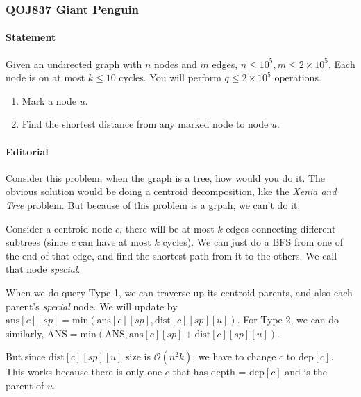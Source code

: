\subsubsection{QOJ837 Giant Penguin}


\paragraph{Statement}
Given an undirected graph with $n$ nodes and $m$ edges, $n \le 10^5, m \le 2\times10^5$. Each node is on at most $k \le 10$ cycles. You will perform $q \le 2\times10^5$ operations.
\begin{enumerate}
    \item Mark a node $u$.
    \item Find the shortest distance from any marked node to node $u$.
\end{enumerate}

\paragraph{Editorial} Consider this problem, when the graph is a tree, how would you do it.
The obvious solution would be doing a centroid decomposition, like the \textit{Xenia and Tree} problem.
But because of this problem is a grpah, we can't do it.

Consider a centroid node $c$, there will be at most $k$ edges connecting different subtrees (since $c$ can have at most $k$ cycles).
We can just do a BFS from one of the end of that edge, and find the shortest path from it to the others.
We call that node \textit{special}.

When we do query Type 1, we can traverse up its centroid parents, and also each parent's \textit{special} node.
We will update by $\text{ans}[c][sp] = \text{min}(\text{ans}[c][sp], \text{dist}[c][sp][u])$.
For Type 2, we can do similarly, $\text{ANS} = \text{min}(\text{ANS}, \text{ans}[c][sp] + \text{dist}[c][sp][u])$.

But since $\text{dist}[c][sp][u]$ size is $\mathcal{O}(n^2k)$, we have to change $c$ to $\text{dep}[c]$. This works because there is only one $c$ that has depth = $\text{dep}[c]$ and is the parent of $u$.

